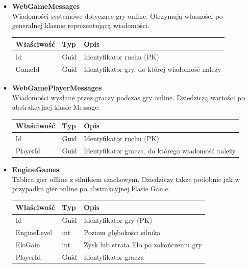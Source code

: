 \documentclass[12pt,a4paper]{article}
\begin{document}
\begin{itemize}
    \item \textbf{WebGameMessages}\\
    Wiadomości systemowe dotyczące gry online. Otrzymują własności po generalnej klasnie reprezentującą wiadomości. 
    \renewcommand{\arraystretch}{1.5}
    \begin{longtable}{|m{4cm}|m{2cm}|m{8cm}|}
        \hline
        \rowcolor{lightgray}
        \textbf{Właściwość} & \textbf{Typ} & \textbf{Opis} \\ \hline
        \endhead
        \hline
        Id & Guid & Identyfikator ruchu (PK) \\ \hline
        GameId & Guid & Identyfikator gry, do której wiadomość należy \\ \hline
    \end{longtable}

    \item \textbf{WebGamePlayerMessages}\\
    Wiadomości wysłane przez graczy podczas gry online. Dziedziczą wartości po abstrakcyjnej klasie Message.
    \renewcommand{\arraystretch}{1.5}
    \begin{longtable}{|m{4cm}|m{2cm}|m{8cm}|}
        \hline
        \rowcolor{lightgray}
        \textbf{Właściwość} & \textbf{Typ} & \textbf{Opis} \\ \hline
        \endhead
        \hline
        Id & Guid & Identyfikator ruchu (PK) \\ \hline
        PlayerId & Guid & Identyfikator gracza, do którego wiadomość należy \\ \hline
    \end{longtable}
        
\newpage

    \item \textbf{EngineGames}\\
    Tablica gier offline z silnikiem szachowym. Dziedziczy także podobnie jak w przypadku gier online po abstrakcyjnej klasie Game.  
    \renewcommand{\arraystretch}{1.5}
    \begin{longtable}{|m{4cm}|m{2cm}|m{8cm}|}
        \hline
        \rowcolor{lightgray}
        \textbf{Właściwość} & \textbf{Typ} & \textbf{Opis} \\ \hline
        \endhead
        \hline
        Id & Guid & Identyfikator gry (PK) \\ \hline
        EngineLevel & int & Poziom głębokości silnika \\ \hline
        EloGain & int & Zysk lub strata Elo po zakończeniu gry \\ \hline
        PlayerId & Guid & Identyfikator gracza \\ \hline
    \end{longtable}
    

\end{itemize}
\end{document}

